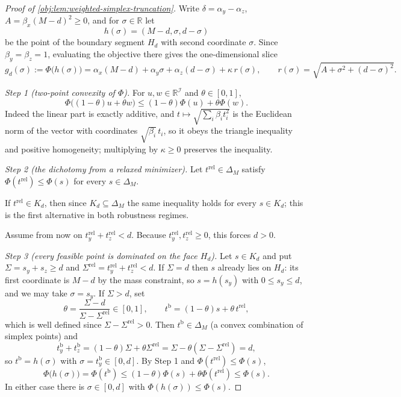 \begin{proof}[Proof of \cref{obj:lem:weighted-simplex-truncation}]
Write \(\delta=\alpha_y-\alpha_z\), \(A=\beta_x(M-d)^2\ge0\), and for \(\sigma\in\mathbb R\) let
\[
h(\sigma)=(M-d,\sigma,d-\sigma)
\]
be the point of the boundary segment \(H_d\) with second coordinate \(\sigma\).  Since \(\beta_y=\beta_z=1\), evaluating the objective there gives the one-dimensional slice
\[
g_d(\sigma):=\Phi\bigl(h(\sigma)\bigr)
=\alpha_x(M-d)+\alpha_y\sigma+\alpha_z(d-\sigma)
+\kappa\,r(\sigma),
\qquad
r(\sigma)=\sqrt{A+\sigma^2+(d-\sigma)^2}.
\]

\emph{Step 1 (two-point convexity of \(\Phi\)).}  For \(u,w\in\mathbb R^{\mathcal I}\) and \(\theta\in[0,1]\),
\[
\Phi\bigl((1-\theta)u+\theta w\bigr)\le(1-\theta)\Phi(u)+\theta\Phi(w).
\]
Indeed the linear part is exactly additive, and \(t\mapsto\sqrt{\sum_i\beta_it_i^2}\) is the Euclidean norm of the vector with coordinates \(\sqrt{\beta_i}\,t_i\), so it obeys the triangle inequality and positive homogeneity; multiplying by \(\kappa\ge0\) preserves the inequality. %

\emph{Step 2 (the dichotomy from a relaxed minimizer).}  Let \(t^{\mathrm{rel}}\in\Delta_M\) satisfy \(\Phi(t^{\mathrm{rel}})\le\Phi(s)\) for every \(s\in\Delta_M\).

If \(t^{\mathrm{rel}}\in K_d\), then since \(K_d\subseteq\Delta_M\) the same inequality holds for every \(s\in K_d\); this is the first alternative in both robustness regimes. %

Assume from now on \(t^{\mathrm{rel}}_y+t^{\mathrm{rel}}_z<d\).  Because \(t^{\mathrm{rel}}_y,t^{\mathrm{rel}}_z\ge0\), this forces \(d>0\).

\emph{Step 3 (every feasible point is dominated on the face \(H_d\)).}  Let \(s\in K_d\) and put \(\Sigma=s_y+s_z\ge d\) and \(\Sigma^{\mathrm{rel}}=t^{\mathrm{rel}}_y+t^{\mathrm{rel}}_z<d\).  If \(\Sigma=d\) then \(s\) already lies on \(H_d\): its first coordinate is \(M-d\) by the mass constraint, so \(s=h(s_y)\) with \(0\le s_y\le d\), and we may take \(\sigma=s_y\).  If \(\Sigma>d\), set
\[
\theta=\frac{\Sigma-d}{\Sigma-\Sigma^{\mathrm{rel}}}\in[0,1],
\qquad
t^{\mathrm b}=(1-\theta)s+\theta\,t^{\mathrm{rel}} ,
\]
which is well defined since \(\Sigma-\Sigma^{\mathrm{rel}}>0\).  Then \(t^{\mathrm b}\in\Delta_M\) (a convex combination of simplex points) and
\[
t^{\mathrm b}_y+t^{\mathrm b}_z=(1-\theta)\Sigma+\theta\Sigma^{\mathrm{rel}}=\Sigma-\theta(\Sigma-\Sigma^{\mathrm{rel}})=d,
\]
so \(t^{\mathrm b}=h(\sigma)\) with \(\sigma=t^{\mathrm b}_y\in[0,d]\).  By Step 1 and \(\Phi(t^{\mathrm{rel}})\le\Phi(s)\),
\[
\Phi\bigl(h(\sigma)\bigr)=\Phi(t^{\mathrm b})
\le(1-\theta)\Phi(s)+\theta\Phi(t^{\mathrm{rel}})
\le\Phi(s).
\]
In either case there is \(\sigma\in[0,d]\) with \(\Phi(h(\sigma))\le\Phi(s)\). %


\end{proof}
